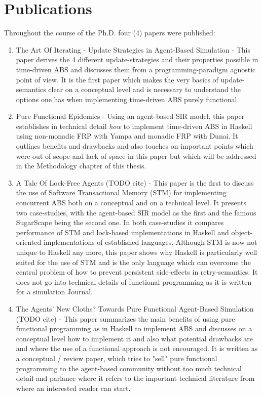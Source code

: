 \section{Publications}
Throughout the course of the Ph.D. four (4) papers were published:

\begin{enumerate}
	\item The Art Of Iterating - Update Strategies in Agent-Based Simulation \cite{thaler_art_2017} - This paper derives the 4 different update-strategies and their properties possible in time-driven ABS and discusses them from a programming-paradigm agnostic point of view. It is the first paper which makes the very basics of update-semantics clear on a conceptual level and is necessary to understand the options one has when implementing time-driven ABS purely functional.
	
	\item Pure Functional Epidemics \cite{thaler_pure_2019} - Using an agent-based SIR model, this paper establishes in technical detail \textit{how} to implement time-driven ABS in Haskell using non-monadic FRP with Yampa and monadic FRP with Dunai. It outlines benefits and drawbacks and also touches on important points which were out of scope and lack of space in this paper but which will be addressed in the Methodology chapter of this thesis.
	
	\item A Tale Of Lock-Free Agents (TODO cite) - This paper is the first to discuss the use of Software Transactional Memory (STM) for implementing concurrent ABS both on a conceptual and on a technical level. It presents two case-studies, with the agent-based SIR model as the first and the famous SugarScape being the second one. In both case-studies it compares performance of STM and lock-based implementations in Haskell and object-oriented implementations of established languages. Although STM is now not unique to Haskell any more, this paper shows why Haskell is particularly well suited for the use of STM and is the only language which can overcome the central problem of how to prevent persistent side-effects in retry-semantics. It does not go into technical details of functional programming as it is written for a simulation Journal.

	\item The Agents' New Cloths? Towards Pure Functional Agent-Based Simulation (TODO cite) - This paper summarizes the main benefits of using pure functional programming as in Haskell to implement ABS and discusses on a conceptual level how to implement it and also what potential drawbacks are and where the use of a functional approach is not encouraged. It is written as a conceptual / review paper, which tries to "sell" pure functional programming to the agent-based community without too much technical detail and parlance where it refers to the important technical literature from where an interested reader can start.
	

\end{enumerate}
